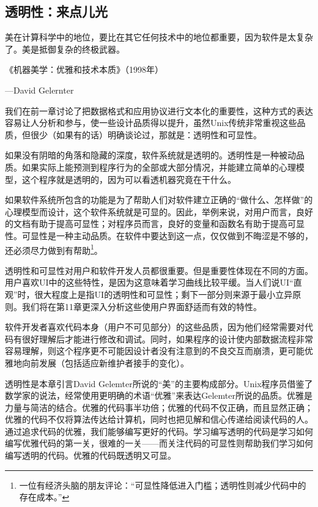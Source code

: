 \documentclass[12pt,oneside]{book}
\begin{document}
\begin{common-format}
\chapter{透明性：来点儿光}
\begin{flushright}
\begin{notecard}{28em}
美在计算科学中的地位，要比在其它任何技术中的地位都重要，因为软件是太复杂了。美是抵御复杂的终极武器。

{\hfill 《机器美学：优雅和技术本质》（1998年）}
    
{\hfill —David Gelernter}
\end{notecard}
\end{flushright}

我们在前一章讨论了把数据格式和应用协议进行文本化的重要性，这种方式的表达容易让人分析和参与，使一些设计品质得以提升，虽然Unix传统非常重视这些品质，但很少（如果有的话）明确谈论过，那就是：透明性和可显性。

如果没有阴暗的角落和隐藏的深度，软件系统就是透明的。透明性是一种被动品质。如果实际上能预测到程序行为的全部或大部分情况，并能建立简单的心理模型，这个程序就是透明的，因为可以看透机器究竟在干什么。

如果软件系统所包含的功能是为了帮助人们对软件建立正确的“做什么、怎样做”的心理模型而设计，这个软件系统就是可显的。因此，举例来说，对用户而言，良好的文档有助于提高可显性；对程序员而言，良好的变量和函数名有助于提高可显性。可显性是一种主动品质。在软件中要达到这一点，仅仅做到不晦涩是不够的，还必须尽力做到有帮助\footnote{一位有经济头脑的朋友评论：“可显性降低进入门槛；透明性则减少代码中的存在成本。”}。

透明性和可显性对用户和软件开发人员都很重要。但是重要性体现在不同的方面。用户喜欢UI中的这些特性，是因为这意味着学习曲线比较平缓。当人们说UI“直观”时，很大程度上是指UI的透明性和可显性；剩下一部分则来源于最小立异原则。我们将在第11章更深入分析这些使用户界面舒适而有效的特性。

软件开发者喜欢代码本身（用户不可见部分）的这些品质，因为他们经常需要对代码有很好理解后才能进行修改和调试。同时，如果程序的设计使内部数据流程非常容易理解，则这个程序更不可能因设计者没有注意到的不良交互而崩溃，更可能优雅地向前发展（包括适应新维护者接手的变化）。

透明性是本章引言David Gelemter所说的“美”的主要构成部分。Unix程序员借鉴了数学家的说法，经常使用更明确的术语“优雅”来表达Gelemter所说的品质。优雅是力量与简洁的结合。优雅的代码事半功倍；优雅的代码不仅正确，而且显然正确；优雅的代码不仅将算法传达给计算机，同时也把见解和信心传递给阅读代码的人。通过追求代码的优雅，我们能够编写更好的代码。学习编写透明的代码是学习如何编写优雅代码的第一关，很难的一关——而关注代码的可显性则帮助我们学习如何编写透明的代码。优雅的代码既透明又可显。


\end{common-format}
\end{document}
